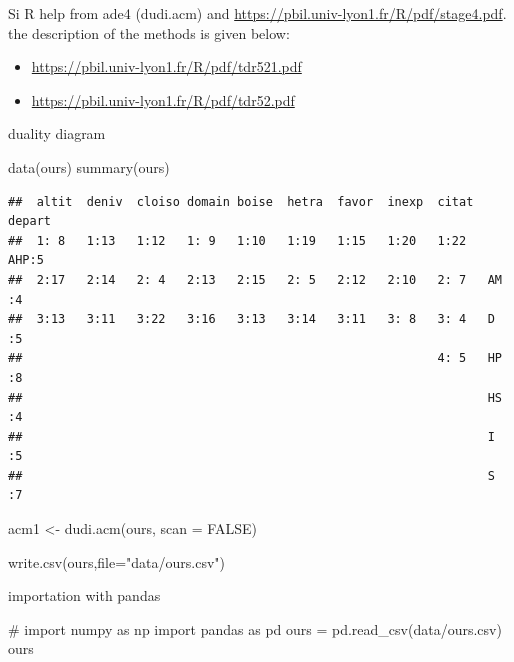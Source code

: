 \documentclass[
  10pt,
]{article}
\newenvironment{Shaded}{\begin{snugshade}}{\end{snugshade}}
\newcommand{\NormalTok}[1]{#1}
\providecommand{\tightlist}{%
  \setlength{\itemsep}{0pt}\setlength{\parskip}{0pt}}
\begin{document}
Si R help from ade4 (dudi.acm) and
\url{https://pbil.univ-lyon1.fr/R/pdf/stage4.pdf}. the description of
the methods is given below:

\begin{itemize}
\tightlist
\item
  \url{https://pbil.univ-lyon1.fr/R/pdf/tdr521.pdf}
\item
  \url{https://pbil.univ-lyon1.fr/R/pdf/tdr52.pdf}
\end{itemize}

duality diagram

\begin{Shaded}
\begin{Highlighting}[]
\NormalTok{data(ours)}
\NormalTok{summary(ours)}
\end{Highlighting}
\end{Shaded}

\begin{verbatim}
##  altit  deniv  cloiso domain boise  hetra  favor  inexp  citat  depart 
##  1: 8   1:13   1:12   1: 9   1:10   1:19   1:15   1:20   1:22   AHP:5  
##  2:17   2:14   2: 4   2:13   2:15   2: 5   2:12   2:10   2: 7   AM :4  
##  3:13   3:11   3:22   3:16   3:13   3:14   3:11   3: 8   3: 4   D  :5  
##                                                          4: 5   HP :8  
##                                                                 HS :4  
##                                                                 I  :5  
##                                                                 S  :7
\end{verbatim}

\begin{Shaded}
\begin{Highlighting}[]
\NormalTok{acm1 \textless{}{-} dudi.acm(ours, scan = FALSE)}
\end{Highlighting}
\end{Shaded}

\begin{Shaded}
\begin{Highlighting}[]
\NormalTok{write.csv(ours,file="data/ours.csv")}
\end{Highlighting}
\end{Shaded}

importation with pandas

\begin{Shaded}
\begin{Highlighting}[]
\NormalTok{\# import numpy as np }
\NormalTok{import pandas as pd}
\NormalTok{ours = pd.read\_csv(\textquotesingle{}data/ours.csv\textquotesingle{})}
\NormalTok{ours}
\end{Highlighting}
\end{Shaded}
\end{document}
